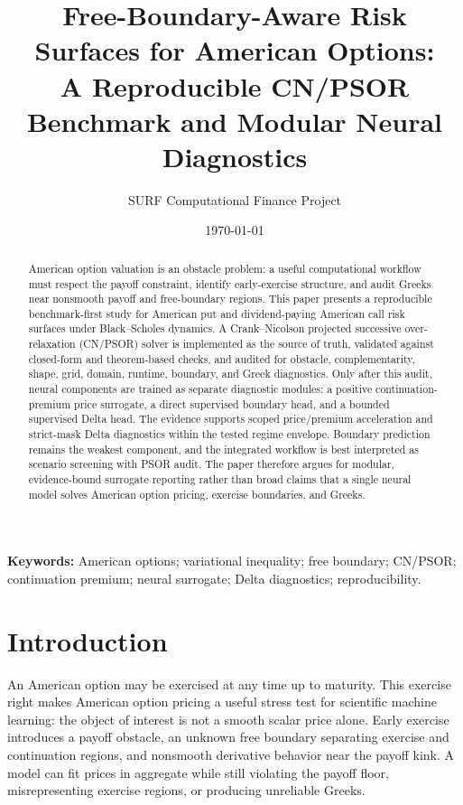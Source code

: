 \documentclass[11pt]{article}
\title{Free-Boundary-Aware Risk Surfaces for American Options:\\
A Reproducible CN/PSOR Benchmark and Modular Neural Diagnostics}
\author{SURF Computational Finance Project}
\date{\today}
\begin{document}
\maketitle

\begin{abstract}
American option valuation is an obstacle problem: a useful computational workflow must respect the payoff constraint, identify early-exercise structure, and audit Greeks near nonsmooth payoff and free-boundary regions. This paper presents a reproducible benchmark-first study for American put and dividend-paying American call risk surfaces under Black--Scholes dynamics. A Crank--Nicolson projected successive over-relaxation (CN/PSOR) solver is implemented as the source of truth, validated against closed-form and theorem-based checks, and audited for obstacle, complementarity, shape, grid, domain, runtime, boundary, and Greek diagnostics. Only after this audit, neural components are trained as separate diagnostic modules: a positive continuation-premium price surrogate, a direct supervised boundary head, and a bounded supervised Delta head. The evidence supports scoped price/premium acceleration and strict-mask Delta diagnostics within the tested regime envelope. Boundary prediction remains the weakest component, and the integrated workflow is best interpreted as scenario screening with PSOR audit. The paper therefore argues for modular, evidence-bound surrogate reporting rather than broad claims that a single neural model solves American option pricing, exercise boundaries, and Greeks.
\end{abstract}

\textbf{Keywords:} American options; variational inequality; free boundary; CN/PSOR; continuation premium; neural surrogate; Delta diagnostics; reproducibility.

\section{Introduction}

An American option may be exercised at any time up to maturity. This exercise
right makes American option pricing a useful stress test for scientific machine
learning: the object of interest is not a smooth scalar price alone. Early
exercise introduces a payoff obstacle, an unknown free boundary separating
exercise and continuation regions, and nonsmooth derivative behavior near the
payoff kink. A model can fit prices in aggregate while still violating the
payoff floor, misrepresenting exercise regions, or producing unreliable Greeks.
\end{document}
